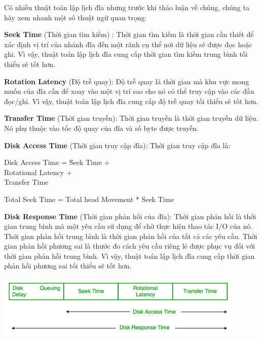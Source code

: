 \documentclass{report}
\begin{document}
    Có nhiều thuật toán lập lịch đĩa nhưng trước khi thảo luận về chúng, chúng ta hãy xem nhanh một số thuật ngữ quan trọng:

    \textbf{Seek Time} (Thời gian tìm kiếm) : Thời gian tìm kiếm là thời gian cần thiết để xác định vị trí của nhánh đĩa đến một rãnh cụ thể nơi dữ liệu sẽ được đọc hoặc ghi. Vì vậy, thuật toán lập lịch đĩa cung cấp thời gian tìm kiếm trung bình tối thiểu sẽ tốt hơn.
    
    \textbf{Rotation Latency} (Độ trễ quay): Độ trễ quay là thời gian mà khu vực mong muốn của đĩa cần để xoay vào một vị trí sao cho nó có thể truy cập vào các đầu đọc/ghi. Vì vậy, thuật toán lập lịch đĩa cung cấp độ trễ quay tối thiểu sẽ tốt hơn.
    
    \textbf{Transfer Time} (Thời gian truyền): Thời gian truyền là thời gian truyền dữ liệu. Nó phụ thuộc vào tốc độ quay của đĩa và số byte được truyền.
    
    \textbf{Disk Access Time} (Thời gian truy cập đĩa): Thời gian truy cập đĩa là:

    \begin{tcolorbox}
    
    \begin{tabbing}
    Disk Access Time =  \= Seek Time + \\
                        \> Rotational Latency + \\
                        \> Transfer Time \\
    \end{tabbing}
    
      Total Seek Time = Total head Movement * Seek Time
    \end{tcolorbox} 

    \textbf{Disk Response Time} (Thời gian phản hồi của đĩa): Thời gian phản hồi là thời gian trung bình mà một yêu cầu sử dụng để chờ thực hiện thao tác I/O của nó. Thời gian phản hồi trung bình là thời gian phản hồi của tất cả các yêu cầu. Thời gian phản hồi phương sai là thước đo cách yêu cầu riêng lẻ được phục vụ đối với thời gian phản hồi trung bình. Vì vậy, thuật toán lập lịch đĩa cung cấp thời gian phản hồi phương sai tối thiểu sẽ tốt hơn.

    \includegraphics[width = 12cm]{images/disc-scheduling-algorithms.png}
        
\end{document}
